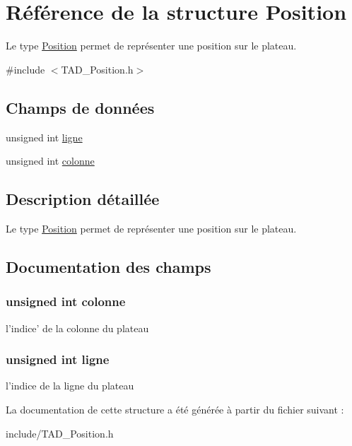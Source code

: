 \hypertarget{struct_position}{\section{Référence de la structure Position}
\label{struct_position}
}


Le type \hyperlink{struct_position}{Position} permet de représenter une position sur le plateau.  




{\ttfamily \#include $<$T\-A\-D\-\_\-\-Position.\-h$>$}

\subsection*{Champs de données}
\begin{DoxyCompactItemize}
\item 
unsigned int \hyperlink{struct_position_a90d401bbcd8cccd70cbe1b638ba239cf}{ligne}
\item 
unsigned int \hyperlink{struct_position_a62f746fce1dec24c5a8c5fa3f7a71bcd}{colonne}
\end{DoxyCompactItemize}


\subsection{Description détaillée}
Le type \hyperlink{struct_position}{Position} permet de représenter une position sur le plateau. 

\subsection{Documentation des champs}
\hypertarget{struct_position_a62f746fce1dec24c5a8c5fa3f7a71bcd}{
\subsubsection[{colonne}]{\setlength{\rightskip}{0pt plus 5cm}unsigned int colonne}}\label{struct_position_a62f746fce1dec24c5a8c5fa3f7a71bcd}
l'indice' de la colonne du plateau \hypertarget{struct_position_a90d401bbcd8cccd70cbe1b638ba239cf}{
\subsubsection[{ligne}]{\setlength{\rightskip}{0pt plus 5cm}unsigned int ligne}}\label{struct_position_a90d401bbcd8cccd70cbe1b638ba239cf}
l'indice de la ligne du plateau 

La documentation de cette structure a été générée à partir du fichier suivant \-:\begin{DoxyCompactItemize}
\item 
include/T\-A\-D\-\_\-\-Position.\-h\end{DoxyCompactItemize}
